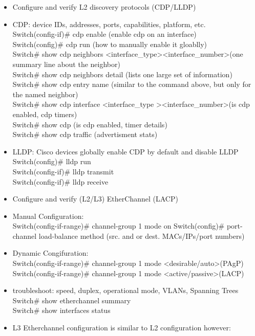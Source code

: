 \documentclass{article}
\begin{document}
\begin{itemize}
  \item Configure and verify L2 discovery protocols (CDP/LLDP)
  	\item[] CDP: device IDs, addresses, ports, capabilities, platform, etc.\\
  		Switch(config-if)\# cdp enable (enable cdp on an interface)\\
  		Switch(config)\# cdp run (how to manually enable it gloablly)\\
  		Switch\# show cdp neighbors \textless interface\_type\textgreater \textless interface\_number\textgreater (one summary line about the neighbor)\\
  		Switch\# show cdp neighbors detail (lists one large set of information)\\
  		Switch\# show cdp entry name (similar to the command above, but only for the named neighbor)\\
  		Switch\# show cdp interface \textless interface\_type \textgreater \textless interface\_number\textgreater (is cdp enabled, cdp timers)\\
  		Switch\# show cdp (is cdp enabled, timer details)\\
  		Switch\# show cdp traffic (advertisment stats)
  	\item[] LLDP: Cisco devices globally enable CDP by default and disable LLDP\\
  		Switch(config)\# lldp run\\
  		Switch(config-if)\# lldp transmit\\
  		Switch(config-if)\# lldp receive
  \item Configure and verify (L2/L3) EtherChannel (LACP)
	\item[] Manual Configuration:\\
		Switch(config-if-range)\# channel-group 1 mode on
		Switch(config)\# port-channel load-balance method (src. and or dest. MACs/IPs/port numbers)
	\item[] Dynamic Congifuration:\\
		Switch(config-if-range)\# channel-group 1 mode \textless desirable/auto\textgreater (PAgP)\\
		Switch(config-if-range)\# channel-group 1 mode \textless active/passive\textgreater (LACP)
	\item[] troubleshoot: speed, duplex, operational mode, VLANs, Spanning Trees\\
		Switch\# show etherchannel summary\\
		Switch\# show interfaces status
	\item[] L3 Etherchannel configuration is similar to L2 configuration however:\\

\end{itemize}
\end{document}
